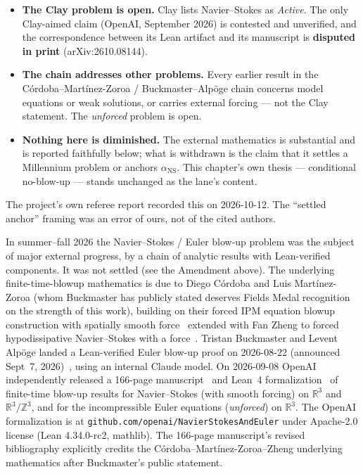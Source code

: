 \begin{itemize}
\item \textbf{The Clay problem is open.} Clay lists Navier--Stokes as
\emph{Active}. The only Clay-aimed claim (OpenAI, September 2026) is contested
and unverified, and the correspondence between its Lean artifact and its
manuscript is \textbf{disputed in print} (arXiv:2610.08144).
\item \textbf{The chain addresses other problems.} Every earlier result in the
C\'ordoba--Mart\'inez-Zoroa / Buckmaster--Alp\"oge chain concerns model
equations or weak solutions, or carries external forcing --- not the Clay
statement. The \emph{unforced} problem is open.
\item \textbf{Nothing here is diminished.} The external mathematics is
substantial and is reported faithfully below; what is withdrawn is the claim
that it settles a Millennium problem or anchors
$\alpha_{\text{NS}}$. This chapter's own thesis --- conditional no-blow-up ---
stands unchanged as the lane's content.
\end{itemize}

\noindent The project's own referee report recorded this on 2026-10-12. The
``settled anchor'' framing was an error of ours, not of the cited authors.

\begin{intuitive}
In summer--fall 2026 the Navier--Stokes / Euler blow-up problem was the
subject of major external progress, by a chain of analytic results with
Lean-verified components. It was not settled (see the Amendment above). The
underlying finite-time-blowup mathematics is due to Diego
C\'ordoba and Luis Mart\'inez-Zoroa (whom Buckmaster has publicly
stated deserves Fields Medal recognition on the strength of this
work), building on their forced IPM equation blowup construction with
spatially smooth force~\cite{cordoba-martinezzoroa2026ipm} extended
with Fan Zheng to forced hypodissipative Navier--Stokes with a
force~\cite{cordoba-martinezzoroa-zheng2026hns}. Tristan Buckmaster
and Levent Alp\"oge landed a Lean-verified Euler blow-up proof on
2026-08-22 (announced Sept~7,
2026)~\cite{buckmaster-alpoge2026euler}, using an internal Claude
model. On 2026-09-08 OpenAI independently released a 166-page
manuscript~\cite{openai2026navierstokes} and Lean~4
formalization~\cite{openai2026navierstokeslean} of finite-time
blow-up results for Navier--Stokes (with smooth forcing) on
$\mathbb{R}^3$ and $\mathbb{R}^3/\mathbb{Z}^3$, and for the
incompressible Euler equations (\emph{unforced}) on $\mathbb{R}^3$.
The OpenAI formalization is at
\texttt{github.com/openai/NavierStokesAndEuler} under Apache-2.0
license (Lean 4.34.0-rc2, mathlib). The 166-page manuscript's
revised bibliography explicitly credits the
C\'ordoba--Mart\'inez-Zoroa--Zheng underlying mathematics after
Buckmaster's public statement.
\end{intuitive}


